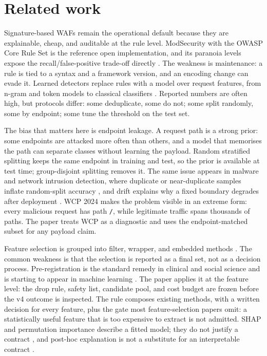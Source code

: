 \documentclass[preprint,11pt]{elsarticle}
\begin{document}
\section{Related work}\label{related-work}

Signature-based WAFs remain the operational default because they are
explainable, cheap, and auditable at the rule level. ModSecurity with
the OWASP Core Rule Set is the reference open implementation, and its
paranoia levels expose the recall/false-positive trade-off directly
\citep{ristic2010modsecurity, owasp_crs}. The weakness is maintenance: a
rule is tied to a syntax and a framework version, and an encoding change
can evade it. Learned detectors replace rules with a model over request
features, from n-gram and token models
\citep{kruegel2003anomaly, robertson2006behavior} to classical
classifiers
\citep{torrano2010anomaly, sureda2022new, garcia2009anomaly}. Reported
numbers are often high, but protocols differ: some deduplicate, some do
not; some split randomly, some by endpoint; some tune the threshold on
the test set.

The bias that matters here is endpoint leakage. A request path is a
strong prior: some endpoints are attacked more often than others, and a
model that memorises the path can separate classes without learning the
payload. Random stratified splitting keeps the same endpoint in training
and test, so the prior is available at test time; group-disjoint
splitting removes it. The same issue appears in malware and network
intrusion detection, where duplicate or near-duplicate samples inflate
random-split accuracy \citep{arp2022dos, pendlebury2019tesseract}, and
drift explains why a fixed boundary degrades after deployment
\citep{gama2014survey}. WCP 2024 makes the problem visible in an extreme
form: every malicious request has path \texttt{/\allowbreak{}}, while legitimate
traffic spans thousands of paths. The paper treats WCP as a diagnostic
and uses the endpoint-matched subset for any payload claim.

Feature selection is grouped into filter, wrapper, and embedded methods
\citep{guyon2003introduction}. The common weakness is that the selection
is reported as a final set, not as a decision process. Pre-registration
is the standard remedy in clinical and social science and is starting to
appear in machine learning \citep{nosek2018preregistration}. The paper
applies it at the feature level: the drop rule, safety list, candidate
pool, and cost budget are frozen before the v4 outcome is inspected. The
rule composes existing methods, with a written decision for every
feature, plus the gate most feature-selection papers omit: a
statistically useful feature that is too expensive to extract is not
admitted. SHAP and permutation importance describe a fitted model; they
do not justify a contract \citep{lundberg2017unified}, and post-hoc
explanation is not a substitute for an interpretable contract
\citep{rudin2019stop}.
\end{document}
